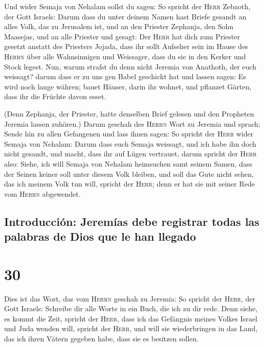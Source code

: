  Und wider Semaja von Nehalam sollst du sagen:
 So spricht der \textsc{Herr} Zebaoth, der Gott Israels:
Darum dass du unter deinem Namen hast Briefe gesandt an alles Volk, das
zu Jerusalem ist, und an den Priester Zephanja, den Sohn Maasejas, und
an alle Priester und gesagt:  Der \textsc{Herr} hat dich
zum Priester gesetzt anstatt des Priesters Jojada, dass ihr sollt
Aufseher sein im Hause des \textsc{Herrn} über alle Wahnsinnigen und
Weissager, dass du sie in den Kerker und Stock legest. 
Nun, warum strafst du denn nicht Jeremia von Anathoth, der euch
weissagt?  darum dass er zu uns gen Babel geschickt hat
und lassen sagen: Es wird noch lange währen; bauet Häuser, darin ihr
wohnet, und pflanzet Gärten, dass ihr die Früchte davon esset.

 (Denn Zephanja, der Priester, hatte denselben Brief
gelesen und den Propheten Jeremia lassen zuhören.)  Darum
geschah des \textsc{Herrn} Wort zu Jeremia und sprach: 
Sende hin zu allen Gefangenen und lass ihnen sagen: So spricht der
\textsc{Herr} wider Semaja von Nehalam: Darum dass euch Semaja weissagt,
und ich habe ihn doch nicht gesandt, und macht, dass ihr auf Lügen
vertrauet,  darum spricht der \textsc{Herr} also: Siehe,
ich will Semaja von Nehalam heimsuchen samt seinem Samen, dass der
Seinen keiner soll unter diesem Volk bleiben, und soll das Gute nicht
sehen, das ich meinem Volk tun will, spricht der \textsc{Herr}; denn er
hat sie mit seiner Rede vom \textsc{Herrn} abgewendet.

\hypertarget{introducciuxf3n-jeremuxedas-debe-registrar-todas-las-palabras-de-dios-que-le-han-llegado}{%
\subsection{Introducción: Jeremías debe registrar todas las palabras de
Dios que le han
llegado}\label{introducciuxf3n-jeremuxedas-debe-registrar-todas-las-palabras-de-dios-que-le-han-llegado}}

\hypertarget{section-29}{%
\section{30}\label{section-29}}

 Dies ist das Wort, das vom \textsc{Herrn} geschah zu
Jeremia:  So spricht der \textsc{Herr}, der Gott Israels:
Schreibe dir alle Worte in ein Buch, die ich zu dir rede. 
Denn siehe, es kommt die Zeit, spricht der \textsc{Herr}, dass ich das
Gefängnis meines Volkes Israel und Juda wenden will, spricht der
\textsc{Herr}, und will sie wiederbringen in das Land, das ich ihren
Vätern gegeben habe, dass sie es besitzen sollen.

